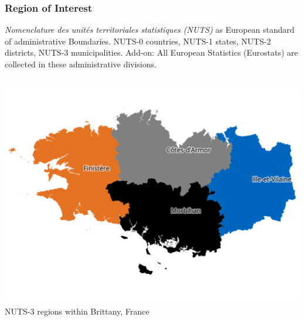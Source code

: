 \documentclass[%
  aspectratio=169,
  9pt,
  USenglish,
  titlegraphic, %
  affiliationintitlepagehead,
  affiliation,
]{beamer}
\begin{document}
\begin{frame}
	\frametitle{Region of Interest}
	
	\emph{Nomenclature des unités territoriales statistiques (NUTS)} as European standard of administrative Boundaries. NUTS-0 countries, NUTS-1 states, NUTS-2 districts, NUTS-3 municipalities. Add-on: All European Statistics (Eurostats) are collected in these administrative divisions.
	
	\begin{columns}
		
			\includegraphics[width=.9\textwidth]{images/map/regions}
			NUTS-3 regions within Brittany, France
		

\end{columns}
\end{frame}
\end{document}
